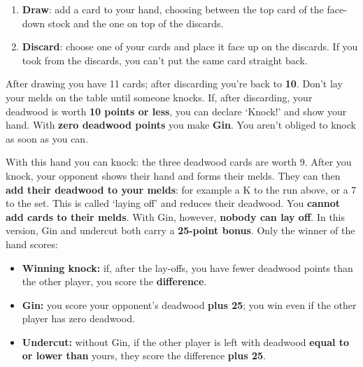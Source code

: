 \documentclass[10pt]{article}
\begin{document}
\startpage
{}
\begin{enumerate}
 \item \textbf{Draw}: add a card to your hand, choosing between the top card of the face-down stock and the one on top of the discards.
 \item \textbf{Discard}: choose one of your cards and place it face up on the discards. If you took from the discards, you can’t put the same card straight back.
\end{enumerate}
After drawing you have 11 cards; after discarding you’re back to \textbf{10}. Don’t lay your melds on the table until someone knocks.
\label{gin-esempio}
If, after discarding, your deadwood is worth \textbf{10 points or less}, you can declare ‘Knock!’ and show your hand. With \textbf{zero deadwood points} you make \textbf{Gin}. You aren’t obliged to knock as soon as you can.
\begin{center}
\hfill
{}\hfill
{}
\end{center}
With this hand you can knock: the three deadwood cards are worth 9.
After you knock, your opponent shows their hand and forms their melds. They can then \textbf{add their deadwood to your melds}: for example a K\sC{} to the run above, or a 7\sC{} to the set. This is called ‘laying off’ and reduces their deadwood. You \textbf{cannot add cards to their melds}. With Gin, however, \textbf{nobody can lay off}.
In this version, Gin and undercut both carry a \textbf{25-point bonus}. Only the winner of the hand scores:
\begin{itemize}
 \item \textbf{Winning knock:} if, after the lay-offs, you have fewer deadwood points than the other player, you score the \textbf{difference}.
 \item \textbf{Gin:} you score your opponent’s deadwood \textbf{plus 25}; you win even if the other player has zero deadwood.
 \item \textbf{Undercut:} without Gin, if the other player is left with deadwood \textbf{equal to or lower than} yours, they score the difference \textbf{plus 25}.
\end{itemize}
\end{document}
